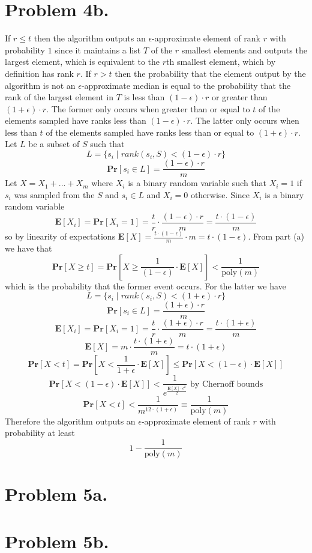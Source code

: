 \documentclass[12pt]{article}
\begin{document}
\newpage
\section*{Problem 4b.}
If $r \le t$ then the algorithm outputs an $\epsilon$-approximate element of
rank $r$ with probability $1$ since it maintains a list $T$ of the $r$ smallest
elements and outputs the largest element, which is equivalent to the
$r$th smallest element, which by definition has rank $r$. If $r > t$ then the
probability that the element output by the algorithm is not an
$\epsilon$-approximate median is equal to the probability that the rank of
the largest element in $T$ is less than $(1-\epsilon)\cdot r$ or greater than
$(1+\epsilon)\cdot r$. The former only occurs when greater than or equal to
$t$ of the elements sampled have ranks less than $(1-\epsilon)\cdot r$. The
latter only occurs when less than $t$ of the elements sampled have ranks less
than or equal to $(1+\epsilon)\cdot r$. Let $L$ be a subset of $S$ such that
$$L = \{s_i \mid rank(s_i, S) < (1-\epsilon)\cdot r\}$$
$$\textbf{Pr}[s_i \in L] = \frac{(1-\epsilon)\cdot r}{m}$$
Let $X = X_1 + ... + X_m$ where $X_i$ is a binary random variable such
that $X_i = 1$ if $s_i$ was sampled from the $S$ and $s_i \in L$ and
$X_i = 0$ otherwise. Since $X_i$ is a binary random variable
$$\textbf{E}[X_i] = \textbf{Pr}[X_i = 1] = \frac{t}{r}\cdot
\frac{(1-\epsilon)\cdot r}{m} = \frac{t\cdot (1-\epsilon)}{m}$$
so by linearity of expectations $\textbf{E}[X] =
\frac{t\cdot (1-\epsilon)}{m}\cdot m = t\cdot(1-\epsilon)$. From part (a) we
have that
$$\textbf{Pr}[X \ge t] =
\textbf{Pr}[X \ge \frac{1}{(1-\epsilon)}\cdot \textbf{E}[X]] <
\frac{1}{\text{poly}(m)}$$
which is the probability that the former event occurs. For the latter we have
$$L = \{s_i \mid rank(s_i, S) < (1+\epsilon)\cdot r\}$$
$$\textbf{Pr}[s_i \in L] = \frac{(1+\epsilon)\cdot r}{m}$$
$$\textbf{E}[X_i] = \textbf{Pr}[X_i = 1] = \frac{t}{r}\cdot
\frac{(1+\epsilon)\cdot r}{m} = \frac{t\cdot(1+\epsilon)}{m}$$
$$\textbf{E}[X] = m\cdot \frac{t\cdot(1+\epsilon)}{m}= t\cdot (1+\epsilon)$$
$$\textbf{Pr}[X < t] =
\textbf{Pr}[X < \frac{1}{1+\epsilon}\cdot\textbf{E}[X]] \le
\textbf{Pr}[X < (1-\epsilon)\cdot\textbf{E}[X]]$$
$$\textbf{Pr}[X < (1-\epsilon)\cdot\textbf{E}[X]] <
\frac{1}{e^{\frac{\textbf{E}[X]\cdot\epsilon^2}{2}}}
\text{ by Chernoff bounds}$$
$$\textbf{Pr}[X < t] < \frac{1}{m^{12\cdot(1+\epsilon)}} \equiv
\frac{1}{\text{poly}(m)}$$
Therefore the algorithm outputs an $\epsilon$-approximate element of rank $r$
with probability at least
$$1-\frac{1}{\text{poly}(m)}$$

\newpage
\section*{Problem 5a.}

\newpage
\section*{Problem 5b.}
\end{document}
